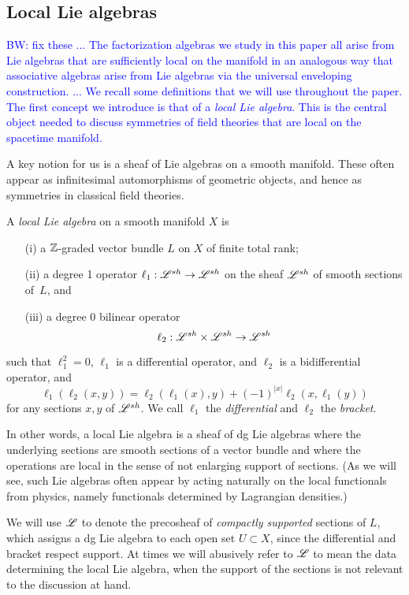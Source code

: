 \documentclass[10pt]{amsart}
\def\brian{\textcolor{blue}{BW: }\textcolor{blue}}
\begin{document}
\subsection{Local Lie algebras}

\brian{fix these
...
The factorization algebras we study in this paper all arise from Lie algebras that are sufficiently local on the manifold in an analogous way that associative algebras arise from Lie algebras via the universal enveloping construction.
...
We recall some definitions that we will use throughout the paper.
The first concept we introduce is that of a {\em local Lie algebra}. 
This is the central object needed to discuss symmetries of field theories that are local on the spacetime manifold. 
}

A key notion for us is a sheaf of Lie algebras on a smooth manifold.
These often appear as infinitesimal automorphisms of geometric objects,
and hence as symmetries in classical field theories.

\begin{dfn} 
A {\em local Lie algebra} on a smooth manifold $X$ is 
\begin{itemize}
\item[(i)] a $\mathbb Z$-graded vector bundle $L$ on $X$ of finite total rank;
\item[(ii)] a degree 1 operator $\ell_1:\mathscr L^{sh} \to \mathscr L^{sh}$ on the sheaf $\mathscr L^{sh}$ of smooth sections of~$L$, and
\item[(iii)] a degree 0 bilinear operator
\[
\ell_2 : \mathscr L^{sh} \times \mathscr L^{sh} \to \mathscr L^{sh}
\]
\end{itemize}
such that $\ell_1^2 = 0$, $\ell_1$ is a differential operator, and $\ell_2$ is a bidifferential operator, and
\[
\ell_1(\ell_2(x,y)) = \ell_2(\ell_1(x), y) + (-1)^{|x|} \ell_2(x, \ell_1(y))
\]
for any sections $x,y$ of $\mathscr L^{sh}$.
We call $\ell_1$ the {\em differential} and $\ell_2$ the {\em bracket}.
\end{dfn}

In other words, a local Lie algebra is a sheaf of dg Lie algebras 
where the underlying sections are smooth sections of a vector bundle and 
where the operations are local in the sense of not enlarging support of sections. 
(As we will see, such Lie algebras often appear by acting naturally on the local functionals from physics, namely functionals determined by Lagrangian densities.)

\begin{rmk}
We will use $\mathscr L$ to denote the precosheaf of {\em compactly supported} sections of $L$,
which assigns a dg Lie algebra to each open set $U \subset X$, 
since the differential and bracket respect support.
At times we will abusively refer to $\mathscr L$ to mean the data determining the local Lie algebra,
when the support of the sections is not relevant to the discussion at hand.
\end{rmk}
\end{document}
